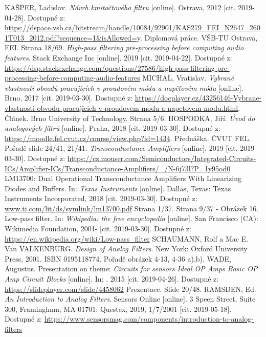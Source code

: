 \documentclass[twoside]{article}
\begin{document}
\begin{thebibliography}{999}
KAŠPER, Ladislav. \textit{Návrh kmitočtového filtru} [online]. Ostrava, 2012 [cit. 2019-04-28]. Dostupné z: \url{https://dspace.vsb.cz/bitstream/handle/10084/92901/KAS279_FEI_N2647_2601T013_2012.pdf?sequence=1&isAllowed=y}. Diplomová práce. VŠB-TU Ostrava, FEI. Strana 18/69.
\textit{High-pass filtering pre-processing before computing audio features}. Stack Exchange Inc [online]. 2019 [cit. 2019-04-22]. Dostupné z: \url{https://dsp.stackexchange.com/questions/27586/high-pass-filtering-pre-processing-before-computing-audio-features}
MICHAL, Vratislav. \textit{Vybrané vlastnosti obvodů pracujících v proudovém módu a napěťovém módu} [online]. Brno, 2017 [cit. 2019-03-30]. Dostupné z: \url{https://docplayer.cz/43256146-Vybrane-vlastnosti-obvodu-pracujicich-v-proudovem-modu-a-napetovem-modu.html}. Článek. Brno University of Technology. Strana 5/6.
HOSPODKA, Jiří. \textit{Úvod do analogových filtrů} [online]. Praha, 2018 [cit. 2019-03-30]. Dostupné z: \url{https://moodle.fel.cvut.cz/course/view.php?id=1434}. Přednáška. ČVUT FEL. Pořadě slide 24/41, 21/41.
\textit{Transconductance Amplifiers} [online]. 2019 [cit. 2019-03-30]. Dostupné z: \url{https://cz.mouser.com/Semiconductors/Integrated-Circuits-ICs/Amplifier-ICs/Transconductance-Amplifiers/_/N-6j73l?P=1y95od0}
LM13700: Dual Operational Transconductance Amplifiers With Linearizing Diodes and Buffers. In: \textit{Texas Instruments} [online]. Dallas, Texas: Texas Instruments Incorporated, 2018 [cit. 2019-03-30]. Dostupné z: \url{www.ti.com/lit/ds/symlink/lm13700.pdf} Strana 1/37. Strana 9/37 - Obrázek 16.
Low-pass filter. In: \textit{Wikipedia: the free encyclopedia} [online]. San Francisco (CA): Wikimedia Foundation, 2001- [cit. 2019-03-30]. Dostupné z: \url{https://en.wikipedia.org/wiki/Low-pass_filter}
SCHAUMANN, Rolf a Mac E. Van VALKENBURG. \textit{Design of Analog Filters}. New York: Oxford University Press, 2001. ISBN 0195118774. Pořadě obrázek 4-13, 4-36 a),b).
WADE, Augustus. Presentation on theme: \textit{Circuits for sensors Ideal OP Amps Basic OP Amp Circuit Blocks} [online]. In: . 2015 [cit. 2019-04-26]. Dostupné z: \url{https://slideplayer.com/slide/4458062} Prezentace. Slide 20/48.
RAMSDEN, Ed. \textit{An Introduction to Analog Filters}. Sensors Online [online]. 3 Speen Street, Suite 300, Framingham, MA 01701: Questex, 2019, 1/7/2001 [cit. 2019-05-18]. Dostupné z: \url{https://www.sensorsmag.com/components/introduction-to-analog-filters}

\end{thebibliography}
\end{document}
